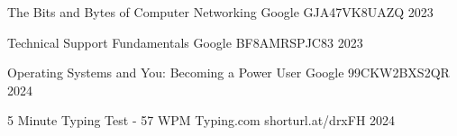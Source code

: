 

\begin{cvhonors}

  \cvhonor
    {The Bits and Bytes of Computer Networking} %
    {Google} %
    {GJA47VK8UAZQ} %
    {2023} %

  \cvhonor
    {Technical Support Fundamentals} %
    {Google} %
    {BF8AMRSPJC83} %
    {2023} %

  \cvhonor
    {Operating Systems and You: Becoming a Power User} %
    {Google} %
    {99CKW2BXS2QR} %
    {2024} %

  \cvhonor
    {5 Minute Typing Test - 57 WPM} %
    {Typing.com} %
    {shorturl.at/drxFH} %
    {2024} %

\end{cvhonors}
